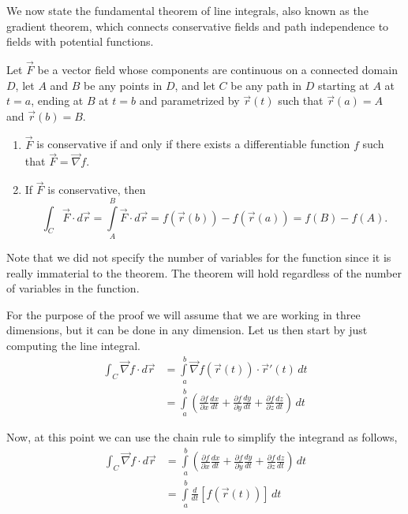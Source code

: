 We now state the fundamental theorem of line integrals, also known as the gradient theorem, which connects conservative fields and path independence to fields with potential functions. 

\begin{theorem}\label{thm:FTofLineIntegrals}
Let $\vec F$ be a vector field whose components are continuous on a connected domain $D$, let $A$ and $B$ be any points in $D$, and let $C$ be any path in $D$ starting at $A$ at $t=a$,  ending at $B$ at $t=b$ and parametrized by $\vec{r}(t)$ such that $\vec{r}(a)=A$ and  $\vec{r}(b)=B$. 
\begin{enumerate}
	\item $\vec F$ is conservative if and only if there exists a differentiable function $f$ such that $\vec F = \vec{\nabla} f$. 
	\item	If $\vec F$ is conservative, then 
	$$\int_C\vec F\cdot d\vec r = \int\limits_A^B \vec F\cdot d\vec r =f\left( {\vec r\left( b \right)} \right) - f\left( {\vec r\left( a \right)} \right)= f(B) - f(A).$$
\end{enumerate}
\end{theorem}

Note that we did not specify the number of variables for the function since it is really immaterial to the theorem. The theorem will hold regardless of the number of variables in the function.


\ifanalysis
For the purpose of the proof we will assume that we are working in three dimensions, but it can be done in any dimension. Let us then start by just computing the line integral.
\begin{align*}
\int_C{{\vec{\nabla} f\cdot d\vec r}} & = \int\limits_{{\,a}}^{{\,b}}{{\vec{\nabla} f\left( {\vec r\left( t \right)} \right)\cdot \vec r'\left( t \right)\,dt}}\\ &  = \int\limits_{{\,a}}^{{\,b}}{{\left( {\frac{{\partial f}}{{\partial x}}\frac{{dx}}{{dt}} + \frac{{\partial f}}{{\partial y}}\frac{{dy}}{{dt}} + \frac{{\partial f}}{{\partial z}}\frac{{dz}}{{dt}}} \right)\,dt}}
\end{align*}

Now, at this point we can use the chain rule to simplify the integrand as follows,
\begin{align*}\int_C{{\vec{\nabla} f\cdot d\vec r}} & = \int\limits_{{\,a}}^{{\,b}}{{\left( {\frac{{\partial f}}{{\partial x}}\frac{{dx}}{{dt}} + \frac{{\partial f}}{{\partial y}}\frac{{dy}}{{dt}} + \frac{{\partial f}}{{\partial z}}\frac{{dz}}{{dt}}} \right)\,dt}}\\ &  = \int\limits_{{\,a}}^{{\,b}}{{\frac{d}{{dt}}\left[ {f\left( {\vec r\left( t \right)} \right)} \right]\,dt}}
\end{align*}

